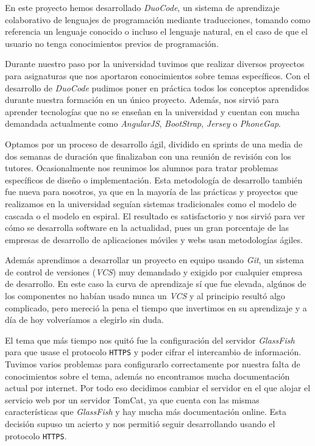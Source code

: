 
En este proyecto hemos desarrollado \textit{DuoCode}, un sistema de aprendizaje colaborativo de lenguajes de programación mediante traducciones, tomando como referencia un lenguaje conocido o incluso el lenguaje natural, en el caso de que el usuario no tenga conocimientos previos de programación. 

Durante nuestro paso por la universidad tuvimos que realizar diversos proyectos para asignaturas que nos aportaron conocimientos sobre temas específicos. Con el desarrollo de \textit{DuoCode} pudimos poner en práctica todos los conceptos aprendidos durante nuestra formación en un único proyecto.
%
Además, nos sirvió para aprender tecnologías que no se enseñan en la universidad y cuentan con mucha demandada actualmente como \textit{AngularJS}, \textit{BootStrap}, \textit{Jersey} o \textit{PhoneGap}.

Optamos por un proceso de desarrollo ágil, dividido en sprints de una media de dos semanas de duración que finalizaban con una reunión de revisión con los tutores. Ocasionalmente nos reunimos los alumnos para tratar problemas específicos de diseño o implementación. Esta metodología de desarrollo también fue nueva para nosotros, ya que en la mayoría de las prácticas y proyectos que realizamos en la universidad seguían sistemas tradicionales como el modelo de cascada o el modelo en espiral. El resultado es satisfactorio y nos sirvió para ver cómo se desarrolla software en la actualidad, pues un gran porcentaje de las empresas de desarrollo de aplicaciones móviles y webs usan metodologías ágiles.

Además aprendimos a desarrollar un proyecto en equipo usando \textit{Git}, un sistema de control de versiones (\textit{VCS}) muy demandado y exigido por cualquier empresa de desarrollo. En este caso la curva de aprendizaje sí que fue elevada, algúnos de los componentes no habían usado nunca un \textit{VCS} y al principio resultó algo complicado, pero mereció la pena el tiempo que invertimos en su aprendizaje y a día de hoy volveríamos a elegirlo sin duda.

El tema que más tiempo nos quitó fue la configuración del servidor \textit{GlassFish} para que usase el protocolo \texttt{HTTPS} y poder cifrar el intercambio de información. Tuvimos varios problemas para configurarlo correctamente por nuestra falta de conocimientos sobre el tema, además no encontramos mucha documentación actual por internet. Por todo eso decidimos cambiar el servidor en el que alojar el servicio web por un servidor TomCat, ya que cuenta con las mismas características que \textit{GlassFish} y hay mucha más documentación online. Esta decisión supuso un acierto y nos permitió seguir desarrollando usando el protocolo \texttt{HTTPS}.


